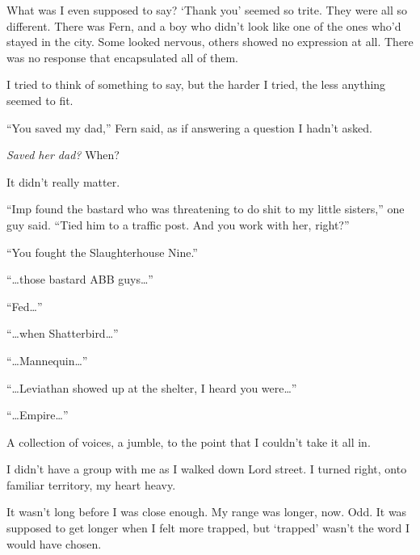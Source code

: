 What was I even supposed to say?  `Thank you' seemed so trite.  They were all so different.  There was Fern, and a boy who didn't look like one of the ones who'd stayed in the city.  Some looked nervous, others showed no expression at all.  There was no response that encapsulated all of them.



I tried to think of something to say, but the harder I tried, the less anything seemed to fit.



``You saved my dad,'' Fern said, as if answering a question I hadn't asked.



\emph{Saved her dad?}  When?



It didn't really matter.



``Imp found the bastard who was threatening to do shit to my little sisters,'' one guy said. ``Tied him to a traffic post.  And you work with her, right?''



``You fought the Slaughterhouse Nine.''



``\ldots{}those bastard ABB guys\ldots''



``Fed\ldots''



``\ldots{}when Shatterbird\ldots''



``\ldots{}Mannequin\ldots''



``\ldots{}Leviathan showed up at the shelter, I heard you were\ldots''



``\ldots{}Empire\ldots''



A collection of voices, a jumble, to the point that I couldn't take it all in.



\sectionbreak



I didn't have a group with me as I walked down Lord street.  I turned right, onto familiar territory, my heart heavy.



It wasn't long before I was close enough.  My range was longer, now.  Odd.  It was supposed to get longer when I felt more trapped, but `trapped' wasn't the word I would have chosen.



